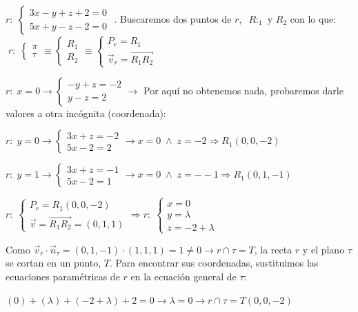 \begin{proofw}\renewcommand{\qedsymbol}{$\diamond$}
	$r:\; \begin{cases}  3x-y+z+2=0\\ 5x+y-z-2=0 \end{cases}$ . Buscaremos dos puntos de $r,\;\; R:_1 \text{ y } R_2$ con lo que:  $\; r:\; \begin{cases} \pi \\ \tau \end{cases} \equiv \begin{cases} R_1 \\ R_2 \end{cases}  \equiv \begin{cases} P_r=R_1 \\ \vec v_r=\overrightarrow{R_1R_2}\end{cases}  $
	
\noindent $r: \; x=0 \to \begin{cases} -y+z=-2\\y-z=2 \end{cases} \to $ Por aquí no obtenemos nada, probaremos darle valores a otra incógnita (coordenada):

\noindent $r:\; y=0 \to \begin{cases} 3x+z=-2\\5x-2=2 \end{cases} \to x=0 \; \wedge \; z=-2 \Rightarrow R_1(0,0,-2)$

\noindent $r:\; y=1 \to \begin{cases} 3x+z=-1\\5x-2=1 \end{cases} \to x=0 \; \wedge \; z=--1 \Rightarrow R_1(0,1,-1)$

\noindent $r:\; \begin{cases} P_r=R_1(0,0,-2) \\ \vec v=\overrightarrow{R_1R_2}=(0,1,1) \end{cases} \Rightarrow r:\; \begin{cases} x=0\\y=\lambda \\z=-2+\lambda \end{cases}$

\noindent Como $\vec v_r \cdot \vec n_{\tau}=(0,1,-1)\cdot (1,1,1)=1\neq 0 \to r\cap \tau =T$, la recta $r$ y el plano $\tau$ se cortan en un punto, $T$. Para encontrar sus coordenadas, sustituimos las ecuaciones paramétricas de $r$ en la ecuación general de $\tau$:

\noindent $(0)+(\lambda)+(-2+\lambda)+2=0 \to \lambda=0 \to r\cap\tau =T(0,0,-2)$
\end{proofw}

